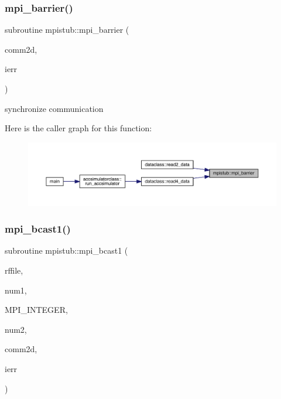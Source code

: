 \mbox{\label{namespacempistub_a0d84064615f696d4877ad9f912d4cbef}} 
\subsubsection{\texorpdfstring{mpi\_barrier()}{mpi\_barrier()}}
{\footnotesize\ttfamily subroutine mpistub\+::mpi\+\_\+barrier (\begin{DoxyParamCaption}\item[{integer}]{comm2d,  }\item[{}]{ierr }\end{DoxyParamCaption})}



synchronize communication 

Here is the caller graph for this function\+:\nopagebreak
\begin{figure}[H]
\begin{center}
\leavevmode
\includegraphics[width=350pt]{namespacempistub_a0d84064615f696d4877ad9f912d4cbef_icgraph}
\end{center}
\end{figure}
\mbox{\label{namespacempistub_a28c2930a0c38a6318865ef760b6e87c0}} 
\subsubsection{\texorpdfstring{mpi\_bcast1()}{mpi\_bcast1()}}
{\footnotesize\ttfamily subroutine mpistub\+::mpi\+\_\+bcast1 (\begin{DoxyParamCaption}\item[{double precision, dimension(\+:)}]{rffile,  }\item[{}]{num1,  }\item[{}]{M\+P\+I\+\_\+\+I\+N\+T\+E\+G\+ER,  }\item[{}]{num2,  }\item[{integer}]{comm2d,  }\item[{}]{ierr }\end{DoxyParamCaption})}




